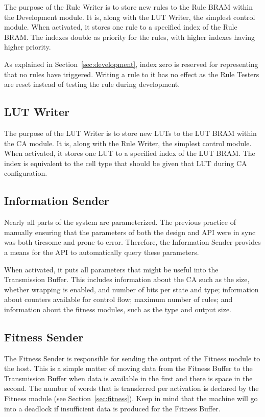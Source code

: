 The purpose of the Rule Writer is to store new rules to the Rule BRAM within the Development module.
It is, along with the LUT Writer, the simplest control module.
When activated, it stores one rule to a specified index of the Rule BRAM.
The indexes double as priority for the rules, with higher indexes having higher priority.

As explained in Section~\ref{sec:development}, index zero is reserved for representing that no rules have triggered.
Writing a rule to it has no effect as the Rule Testers are reset instead of testing the rule during development.

\subsection{LUT Writer}

The purpose of the LUT Writer is to store new LUTs to the LUT BRAM within the CA module.
It is, along with the Rule Writer, the simplest control module.
When activated, it stores one LUT to a specified index of the LUT BRAM.
The index is equivalent to the cell type that should be given that LUT during CA configuration.

\subsection{Information Sender}

Nearly all parts of the system are parameterized.
The previous practice of manually ensuring that the parameters of both the design and API were in sync was both tiresome and prone to error.
Therefore, the Information Sender provides a means for the API to automatically query these parameters.

When activated, it puts all parameters that might be useful into the Transmission Buffer.
This includes information about the CA such as the size, whether wrapping is enabled, and number of bits per state and type;
information about counters available for control flow;
maximum number of rules;
and information about the fitness modules, such as the type and output size.

\subsection{Fitness Sender}

The Fitness Sender is responsible for sending the output of the Fitness module to the host.
This is a simple matter of moving data from the Fitness Buffer to the Transmission Buffer when data is available in the first and there is space in the second.
The number of words that is transferred per activation is declared by the Fitness module (see Section~\ref{sec:fitness}).
Keep in mind that the machine will go into a deadlock if insufficient data is produced for the Fitness Buffer.

